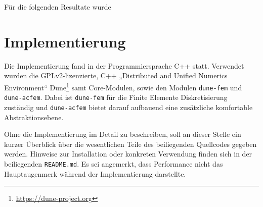 \documentclass{mythesis}
\begin{document}
Für die folgenden Resultate wurde 







\section{Implementierung}


Die Implementierung fand in der Programmiersprache C++ statt.
Verwendet wurden die GPLv2-lizenzierte, C++ „Distributed and Unified Numerics Environment“ Dune\footnote{\url{https://dune-project.org}} samt Core-Modulen, sowie den Modulen \texttt{dune-fem} und \texttt{dune-acfem}.
Dabei ist \texttt{dune-fem} für die Finite Elemente Diskretisierung zuständig und \texttt{dune-acfem} bietet darauf aufbauend eine zusätzliche komfortable Abstraktionsebene.

Ohne die Implementierung im Detail zu beschreiben, soll an dieser Stelle ein kurzer Überblick über die wesentlichen Teile des beiliegenden Quellcodes gegeben werden.
Hinweise zur Installation oder konkreten Verwendung finden sich in der beiliegenden \texttt{README.md}.
Es sei angemerkt, dass Performance nicht das Hauptaugenmerk während der Implementierung darstellte.
\end{document}
